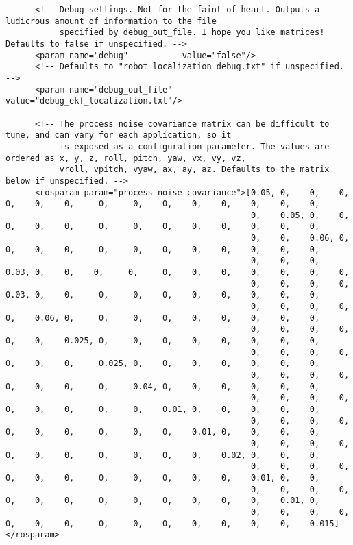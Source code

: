 \begin{verbatim}
      <!-- Debug settings. Not for the faint of heart. Outputs a ludicrous amount of information to the file
           specified by debug_out_file. I hope you like matrices! Defaults to false if unspecified. -->
      <param name="debug"           value="false"/>
      <!-- Defaults to "robot_localization_debug.txt" if unspecified. -->
      <param name="debug_out_file"  value="debug_ekf_localization.txt"/>

      <!-- The process noise covariance matrix can be difficult to tune, and can vary for each application, so it
           is exposed as a configuration parameter. The values are ordered as x, y, z, roll, pitch, yaw, vx, vy, vz,
           vroll, vpitch, vyaw, ax, ay, az. Defaults to the matrix below if unspecified. -->
      <rosparam param="process_noise_covariance">[0.05, 0,    0,    0,    0,    0,    0,     0,     0,    0,    0,    0,    0,    0,    0,
                                                  0,    0.05, 0,    0,    0,    0,    0,     0,     0,    0,    0,    0,    0,    0,    0,
                                                  0,    0,    0.06, 0,    0,    0,    0,     0,     0,    0,    0,    0,    0,    0,    0,
                                                  0,    0,    0,    0.03, 0,    0,    0,     0,     0,    0,    0,    0,    0,    0,    0,
                                                  0,    0,    0,    0,    0.03, 0,    0,     0,     0,    0,    0,    0,    0,    0,    0,
                                                  0,    0,    0,    0,    0,    0.06, 0,     0,     0,    0,    0,    0,    0,    0,    0,
                                                  0,    0,    0,    0,    0,    0,    0.025, 0,     0,    0,    0,    0,    0,    0,    0,
                                                  0,    0,    0,    0,    0,    0,    0,     0.025, 0,    0,    0,    0,    0,    0,    0,
                                                  0,    0,    0,    0,    0,    0,    0,     0,     0.04, 0,    0,    0,    0,    0,    0,
                                                  0,    0,    0,    0,    0,    0,    0,     0,     0,    0.01, 0,    0,    0,    0,    0,
                                                  0,    0,    0,    0,    0,    0,    0,     0,     0,    0,    0.01, 0,    0,    0,    0,
                                                  0,    0,    0,    0,    0,    0,    0,     0,     0,    0,    0,    0.02, 0,    0,    0,
                                                  0,    0,    0,    0,    0,    0,    0,     0,     0,    0,    0,    0,    0.01, 0,    0,
                                                  0,    0,    0,    0,    0,    0,    0,     0,     0,    0,    0,    0,    0,    0.01, 0,
                                                  0,    0,    0,    0,    0,    0,    0,     0,     0,    0,    0,    0,    0,    0,    0.015]</rosparam>


\end{verbatim}
